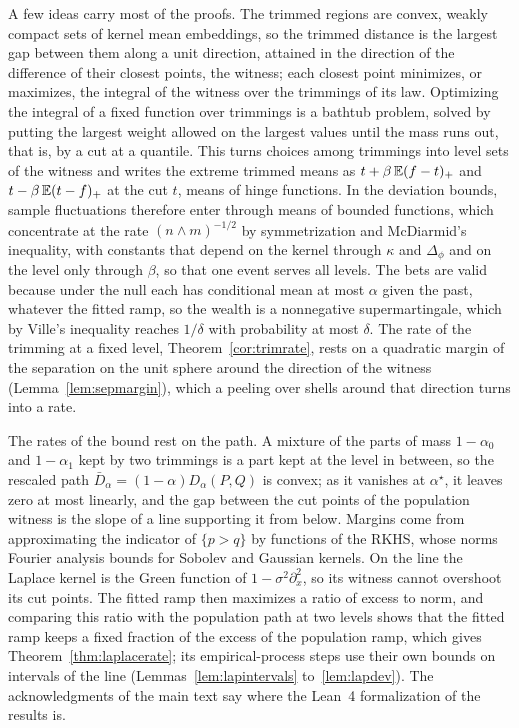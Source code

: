 A few ideas carry most of the proofs. The trimmed regions are convex, weakly compact sets of kernel mean embeddings, so
the trimmed distance is the largest gap between them along a unit direction, attained in the direction of the
difference of their closest points, the witness; each closest point minimizes, or maximizes, the integral of the
witness over the trimmings of its law. Optimizing the integral of a fixed function over trimmings is a bathtub problem,
solved by putting the largest weight allowed on the largest values until the mass runs out, that is, by a cut at a
quantile. This turns choices among trimmings into level sets of the witness and writes the extreme trimmed means as
$t+\beta\,\mathbb{E}(f-t)_+$ and $t-\beta\,\mathbb{E}(t-f)_+$ at the cut $t$, means of hinge functions. In the deviation bounds,
sample fluctuations therefore enter through means of bounded functions, which concentrate at the rate
$(n\wedge m)^{-1/2}$ by symmetrization and McDiarmid's inequality, with constants that depend on the kernel through
$\kappa$ and $\Delta_\phi$ and on the level only through $\beta$, so that one event serves all levels. The bets are
valid because under the null each has conditional mean at most $\alpha$ given the past, whatever the fitted ramp, so
the wealth is a nonnegative supermartingale, which by Ville's inequality reaches $1/\delta$ with probability at most
$\delta$. The rate of the trimming at a fixed level, Theorem~\ref{cor:trimrate}, rests on a quadratic margin of the
separation on the unit sphere around the direction of the witness (Lemma~\ref{lem:sepmargin}), which a peeling over
shells around that direction turns into a rate.

The rates of the bound rest on the path. A mixture of the parts of mass $1-\alpha_0$ and $1-\alpha_1$ kept by two
trimmings is a part kept at the level in between, so the rescaled path $\bar D_\alpha=(1-\alpha)D_\alpha(P,Q)$ is
convex; as it vanishes at $\alpha^\star$, it leaves zero at most linearly, and the gap between the cut points of the
population witness is the slope of a line supporting it from below. Margins come from approximating the indicator of
$\{p>q\}$ by functions of the RKHS, whose norms Fourier analysis bounds for Sobolev and Gaussian kernels. On the line
the Laplace kernel is the Green function of $1-\sigma^2\partial_x^2$, so its witness cannot overshoot its cut points.
The fitted ramp then maximizes a ratio of excess to norm, and comparing this ratio with the population path at two
levels shows that the fitted ramp keeps a fixed fraction of the excess of the population ramp, which gives
Theorem~\ref{thm:laplacerate}; its empirical-process steps use their own bounds on intervals of the line
(Lemmas~\ref{lem:lapintervals} to~\ref{lem:lapdev}). The acknowledgments of the main text say where the Lean~4
formalization of the results is.
